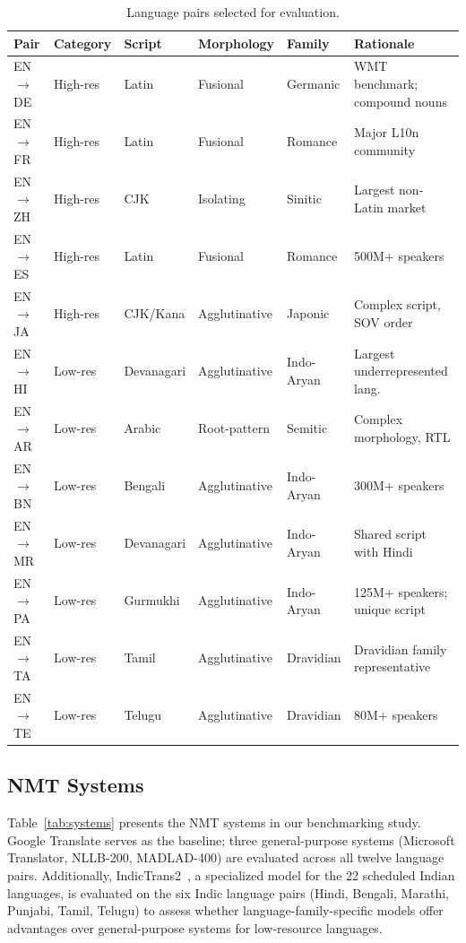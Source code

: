 \documentclass[pdflatex,sn-mathphys-num]{sn-jnl}
\begin{document}
\begin{table}[h]
\centering
\caption{Language pairs selected for evaluation.}\label{tab:langs}
\begin{tabular}{@{}lllllp{4cm}@{}}
\toprule
Pair & Category & Script & Morphology & Family & Rationale \\
\midrule
EN$\to$DE & High-res & Latin & Fusional & Germanic & WMT benchmark; compound nouns \\
EN$\to$FR & High-res & Latin & Fusional & Romance & Major L10n community \\
EN$\to$ZH & High-res & CJK & Isolating & Sinitic & Largest non-Latin market \\
EN$\to$ES & High-res & Latin & Fusional & Romance & 500M+ speakers \\
EN$\to$JA & High-res & CJK/Kana & Agglutinative & Japonic & Complex script, SOV order \\
EN$\to$HI & Low-res & Devanagari & Agglutinative & Indo-Aryan & Largest underrepresented lang. \\
EN$\to$AR & Low-res & Arabic & Root-pattern & Semitic & Complex morphology, RTL \\
EN$\to$BN & Low-res & Bengali & Agglutinative & Indo-Aryan & 300M+ speakers \\
EN$\to$MR & Low-res & Devanagari & Agglutinative & Indo-Aryan & Shared script with Hindi \\
EN$\to$PA & Low-res & Gurmukhi & Agglutinative & Indo-Aryan & 125M+ speakers; unique script \\
EN$\to$TA & Low-res & Tamil & Agglutinative & Dravidian & Dravidian family representative \\
EN$\to$TE & Low-res & Telugu & Agglutinative & Dravidian & 80M+ speakers \\
\bottomrule
\end{tabular}
\end{table}

\subsection{NMT Systems}

Table~\ref{tab:systems} presents the NMT systems in our benchmarking study. Google Translate serves as the baseline; three general-purpose systems (Microsoft Translator, NLLB-200, MADLAD-400) are evaluated across all twelve language pairs. Additionally, IndicTrans2~\cite{30}, a specialized model for the 22 scheduled Indian languages, is evaluated on the six Indic language pairs (Hindi, Bengali, Marathi, Punjabi, Tamil, Telugu) to assess whether language-family-specific models offer advantages over general-purpose systems for low-resource languages.
\end{document}
